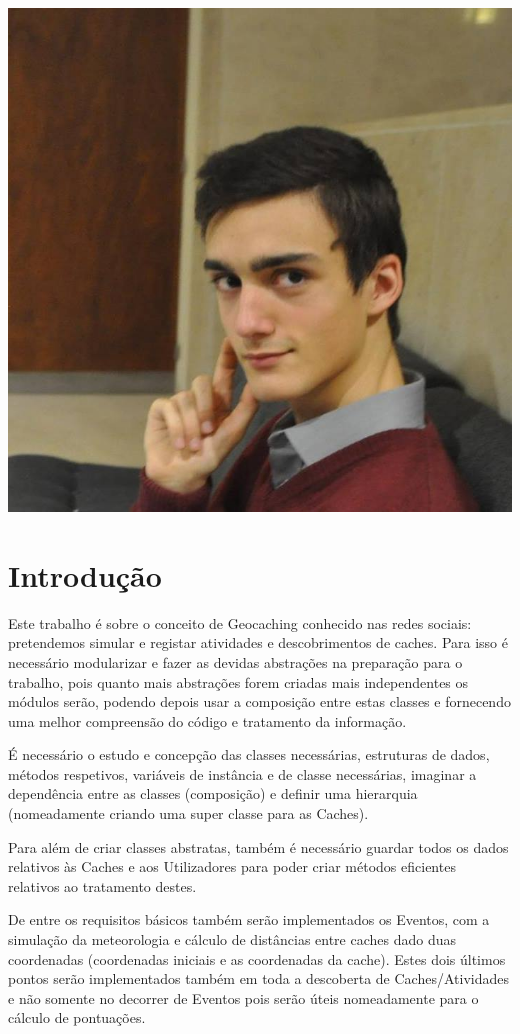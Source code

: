 \documentclass[a4paper,12pt]{article}
\begin{document}
\begin{center}
\includegraphics[height=3\baselineskip,natwidth=369,natheight=430]{martinho.jpg}
\end{center}

\pagebreak


\tableofcontents

\pagebreak

\section{Introdução}

\quad
Este trabalho é sobre o conceito de Geocaching conhecido nas redes sociais: pretendemos simular e registar atividades e descobrimentos de caches. Para isso é necessário modularizar e fazer as devidas abstrações na preparação para o trabalho, pois quanto mais abstrações forem criadas mais independentes os módulos serão, podendo depois usar a composição entre estas classes e fornecendo uma melhor compreensão do código e tratamento da informação.
\par
É necessário o estudo e concepção das classes necessárias, estruturas de dados, métodos respetivos, variáveis de instância e de classe necessárias, imaginar a dependência entre as classes (composição) e definir uma hierarquia (nomeadamente criando uma super classe para as Caches).
\par
Para além de criar classes abstratas, também é necessário guardar todos os dados relativos às Caches e aos Utilizadores para poder criar métodos eficientes relativos ao tratamento destes.
\par De entre os requisitos básicos também serão implementados os Eventos, com a simulação da meteorologia e cálculo de distâncias entre caches dado duas coordenadas (coordenadas iniciais e as coordenadas da cache). Estes dois últimos pontos serão implementados também em toda a descoberta de Caches/Atividades e não somente no decorrer de Eventos pois serão úteis nomeadamente para o cálculo de pontuações.
\end{document}
